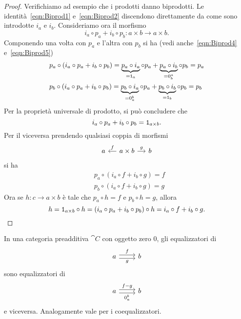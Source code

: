 \begin{proof}
  Verifichiamo ad esempio che i prodotti danno biprodotti. Le
  identità~\eqref{eqn:Biprod1} e~\eqref{eqn:Biprod2} discendono
  direttamente da come sono introdotte \(i_a\) e \(i_b\). Consideriamo
  ora il morfismo
  \[
    i_a \circ p_a + i_b \circ p_b : a \times b \to a \times b .
  \]
  Componendo una volta con \(p_a\) e l'altra con \(p_b\) si ha (vedi
  anche~\eqref{eqn:Biprod4} e~\eqref{eqn:Biprod5})
  \begin{align*}
    & p_a \circ \left(i_a \circ p_a + i_b \circ p_b\right) = \underbrace{p_a \circ
      i_a}_{= \id_a} \circ p_a + \underbrace{p_a
      \circ i_b}_{= 0_b^a} \circ p_b = p_a \\
    & p_b \circ \left(i_a \circ p_a + i_b \circ p_b\right) = \underbrace{p_b \circ
      i_a}_{= 0_a^b} \circ p_a + \underbrace{p_b
      \circ i_b}_{= \id_b} \circ p_b = p_b
  \end{align*}
  Per la proprietà universale di prodotto, si può concludere che
  \[
    i_a \circ p_a + i_b \circ p_b = \mathtt 1_{a \times b} .
  \]
  Per il viceversa prendendo qualsiasi coppia di morfismi
  \[
    \begin{tikzcd}[column sep=small]
      a & a \times b \ar["f", l, swap] \ar["g", r] & b
    \end{tikzcd}
  \]
  si ha
  \begin{align*}
    & p_a \circ \left( i_a \circ f + i_b \circ g \right) = f \\
    & p_b \circ \left( i_a \circ f + i_b \circ g \right) = g
  \end{align*}
  Ora se \(h : c \to a \times b\) è tale che \(p_a \circ h = f\) e \(p_b \circ h =
  g\), allora
  \[
    h = \mathtt 1_{a \times b} \circ h = \left( i_a \circ p_a + i_b \circ p_b \right) \circ h =
    i_a \circ f + i_b \circ g . \qedhere 
  \]
\end{proof}

\begin{proposition}
  In una categoria preadditiva \(\cat C\) con oggetto zero \(0\), gli
  equalizzatori di
  \[
    \begin{tikzcd}
      a \ar["f", r, shift left] \ar["g", r, shift right, swap] & b
    \end{tikzcd}
  \]
  sono equalizzatori di
  \[
    \begin{tikzcd}
      a \ar["{f-g}", r, shift left] \ar["{0_a^b}", r, shift right, swap] & b
    \end{tikzcd}
  \]
  e viceversa. Analogamente vale per i coequalizzatori.
\end{proposition}

